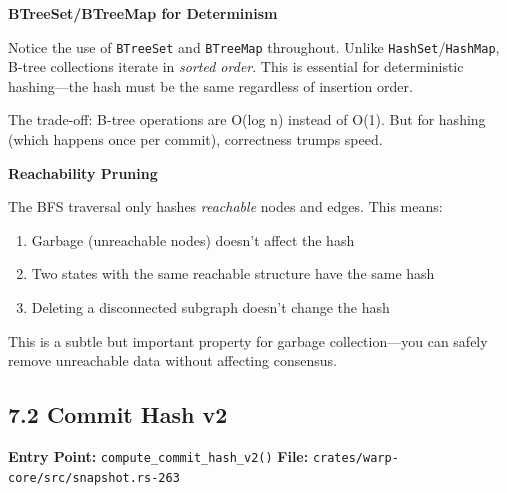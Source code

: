 \documentclass[11pt]{book}
\begin{document}
\begin{cleverpattern}
\textbf{BTreeSet/BTreeMap for Determinism}

Notice the use of \texttt{BTreeSet} and \texttt{BTreeMap} throughout. Unlike \texttt{HashSet}/\texttt{HashMap}, B-tree collections iterate in \emph{sorted order}. This is essential for deterministic hashing---the hash must be the same regardless of insertion order.

The trade-off: B-tree operations are O(log n) instead of O(1). But for hashing (which happens once per commit), correctness trumps speed.
\end{cleverpattern}

\begin{deepdive}
\textbf{Reachability Pruning}

The BFS traversal only hashes \emph{reachable} nodes and edges. This means:

\begin{enumerate}
\item Garbage (unreachable nodes) doesn't affect the hash
\item Two states with the same reachable structure have the same hash
\item Deleting a disconnected subgraph doesn't change the hash
\end{enumerate}

This is a subtle but important property for garbage collection---you can safely remove unreachable data without affecting consensus.
\end{deepdive}

\subsection{7.2 Commit Hash v2}\label{commit-hash-v2}

\textbf{Entry Point:} \texttt{compute\_commit\_hash\_v2()}
\textbf{File:} \texttt{crates/warp-core/src/snapshot.rs-263}
\end{document}
